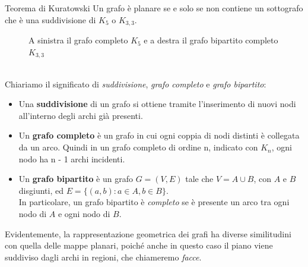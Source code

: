 \documentclass[a4paper,12pt,titlepage]{report}
\begin{document}
	\begin{namedthm*}{Teorema di Kuratowski}
		Un grafo è planare se e solo se non contiene un sottografo che è una suddivisione di $K_5$ o $K_{3,3}$.
	\begin{figure}[h]
		\centering
		\hspace{2cm}
		\vspace{0.5cm}
		\caption{A sinistra il grafo completo $K_5$ e a destra il grafo bipartito completo $K_{3,3}$}
	\end{figure}
	\\Chiariamo il significato di \emph{suddivisione}, \emph{grafo completo} e \emph{grafo bipartito}:
    \begin{itemize}
    	\item Una {\bfseries suddivisione} di un grafo si ottiene tramite l'inserimento di nuovi nodi all'interno degli archi già presenti.
    	\item Un {\bfseries grafo completo} è un grafo in cui ogni coppia di nodi distinti è collegata da un arco. Quindi in un grafo completo di ordine n, indicato con $K_n$, ogni nodo ha n - 1 archi incidenti.
    	\item Un {\bfseries grafo bipartito} è un grafo $G = (V, E)$ tale che $V = A \cup B$, con $A$ e $B$ disgiunti, ed $E = \{(a,b) : a \in A, b \in B\}$.
    	\\In particolare, un grafo bipartito è \emph{completo} se è presente un arco tra ogni nodo di $A$ e ogni nodo di $B$.
    \end{itemize}
    \end{namedthm*}
	Evidentemente, la rappresentazione geometrica dei grafi ha diverse similitudini con quella delle mappe planari, poiché anche in questo caso il piano viene suddiviso dagli archi in regioni, che chiameremo \emph{facce}. 
\end{document}
